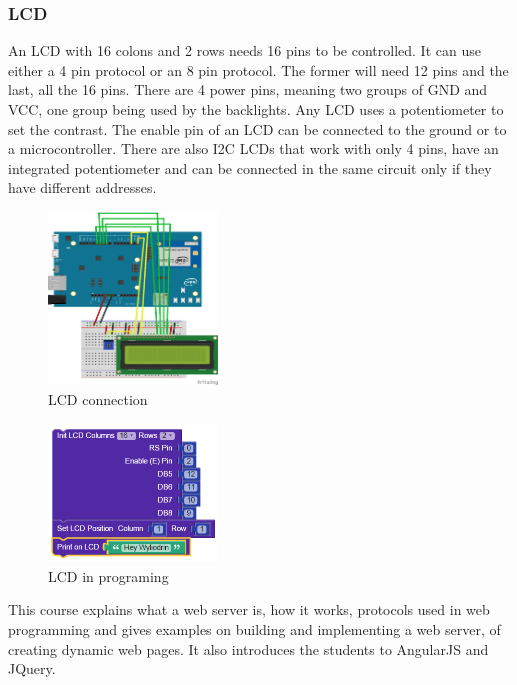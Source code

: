 \subsubsection{LCD}
An LCD with 16 colons and 2 rows needs 16 pins to be controlled. It can use either a 4 pin protocol or an 8 pin protocol. The former will need 12 pins and the last, all the 16 pins. There are 4 power pins, meaning two groups of GND and VCC, one group being used by the backlights. Any LCD uses a potentiometer to set the contrast. The enable pin of an LCD can be connected to the ground or to a microcontroller. There are also I2C LCDs that work with only 4 pins, have an integrated potentiometer and can be connected in the same circuit only if they have different addresses.  

\begin{figure}[ht]
    \centering
    \includegraphics[width=0.4\textwidth]{figures/LCD connection.png}
    \caption{LCD connection}
\end{figure}
\begin{figure}[ht]
    \centering
    \includegraphics[width=0.4\textwidth]{figures/LCD in programing.png}
    \caption{LCD in programing}
\end{figure}

This course explains what a web server is, how it works, protocols used in web programming and gives examples on building and implementing a web server, of creating dynamic web pages. It also introduces the students to AngularJS and JQuery.  

